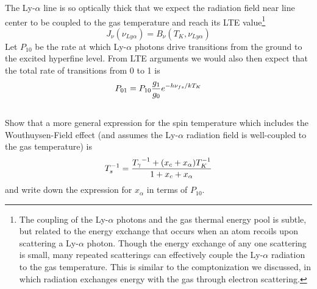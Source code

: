 \documentclass[11pt]{article}
\begin{document}
The Ly-$\alpha$ line is so optically thick that we expect the radiation field
near line center to be coupled to the gas temperature and reach its LTE
value\footnote{The coupling of the Ly-$\alpha$ photons and the gas thermal energy pool is
subtle, but related to the energy exchange that occurs when an atom recoils
upon scattering a Ly-$\alpha$ photon. Though the energy exchange of any one scattering
is small, many repeated scatterings can effectively couple the Ly-$\alpha$ radiation to
the gas temperature. This is similar to the comptonization we discussed, in
which radiation exchanges energy with the gas through electron scattering.}
\def\nuly{{\nu_{Ly\alpha}}}
\begin{equation}
J_\nu(\nuly)=B_\nu(T_K,\nuly)
\end{equation}
Let $P_{10}$ be the rate at which Ly-$\alpha$ photons drive transitions from the ground to
the excited hyperfine level. From LTE arguments we would also then expect that
the total rate of transitions from 0 to 1 is
\begin{equation}
P_{01}=P_{10}\frac{g_1}{g_0}e^{-h{\nu_{fs}}/kT_K}
\end{equation}

\subsection{}
Show that a more general expression for the spin temperature
which includes the Wouthuysen-Field effect (and assumes the 
Ly-$\alpha$ radiation field is well-coupled to the gas temperature) is
\begin{equation}
T_s^{-1}=\frac{{T_\gamma}^{-1}+(x_c+x_\alpha)T_K^{-1}}{1+x_c+x_\alpha}
\end{equation}
and write down the expression for $x_\alpha$ in terms of $P_{10}$.
\end{document}
